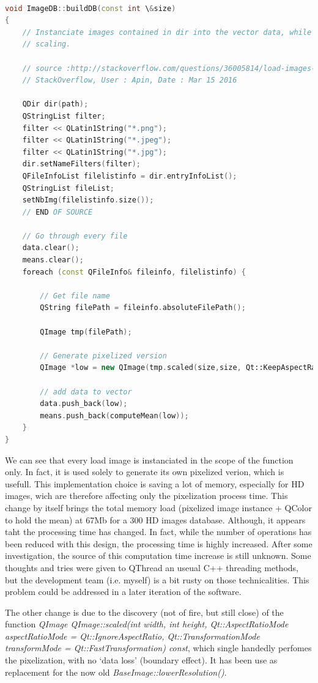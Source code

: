 \documentclass[aps,letterpaper,11pt]{revtex4}
\begin{document}
\begin{lstlisting}[language=C++]

void ImageDB::buildDB(const int \&size)
{
    // Instanciate images contained in dir into the vector data, while performing image
    // scaling.

    // source :http://stackoverflow.com/questions/36005814/load-images-from-folder-with-qt
    // StackOverflow, User : Apin, Date : Mar 15 2016

    QDir dir(path);
    QStringList filter;
    filter << QLatin1String("*.png");
    filter << QLatin1String("*.jpeg");
    filter << QLatin1String("*.jpg");
    dir.setNameFilters(filter);
    QFileInfoList filelistinfo = dir.entryInfoList();
    QStringList fileList;
    setNbImg(filelistinfo.size());
    // END OF SOURCE

    // Go through every file
    data.clear();
    means.clear();
    foreach (const QFileInfo& fileinfo, filelistinfo) {

        // Get file name
        QString filePath = fileinfo.absoluteFilePath();

        QImage tmp(filePath);

        // Generate pixelized version
        QImage *low = new QImage(tmp.scaled(size,size, Qt::KeepAspectRatio));

        // add data to vector
        data.push_back(low);
        means.push_back(computeMean(low));
    }
}
\end{lstlisting}

We can see that every load image is instanciated in the scope of the function only. In fact, it is used solely to generate its own pixelized verion, which is usefull. This implementation choice is saving a lot of memory, especially for HD images, wich are therefore affecting only the pixelization process time.
This change by itself brings the total memory load (pixelized image instance + QColor to hold the mean)  at 67Mb for a 300 HD images database. Although, it appears taht the processing time has changed. In fact, while the number of operations has been reduced with this design, the processing time is highly increased. After some investigation, the source of this computation time increase is still unknown. Some thoughts and tries were given to QThread an useual C++ threading methods, but the development team (i.e. myself) is a bit rusty on those technicalities. This problem could be addressed in a later iteration of the software.

The other change is due to the discovery (not of fire, but still close) of the function \textit{QImage QImage::scaled(int width, int height, Qt::AspectRatioMode aspectRatioMode = Qt::IgnoreAspectRatio, Qt::TransformationMode transformMode = Qt::FastTransformation) const}, which single handedly perfomes the pixelization, with no `data loss' (boundary effect). It has been use as replacement for the now old \textit{BaseImage::lowerResolution()}. 
\end{document}
